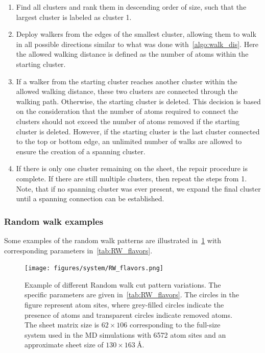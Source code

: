 \begin{enumerate}
  \item Find all clusters and rank them in descending order of size, such that the largest cluster is labeled as cluster 1.
  \item Deploy walkers from the edges of the smallest cluster, allowing them to walk in all possible directions similar to what was done with~\cref{algo:walk_dis}. Here the allowed walking distance is defined as the number of atoms within the starting cluster.
  \item If a walker from the starting cluster reaches another cluster within the allowed walking distance, these two clusters are connected through the walking path. Otherwise, the starting cluster is deleted. This decision is based on the consideration that the number of atoms required to connect the clusters should not exceed the number of atoms removed if the starting cluster is deleted. However, if the starting cluster is the last cluster connected to the top or bottom edge, an unlimited number of walks are allowed to ensure the creation of a spanning cluster.
  \item If there is only one cluster remaining on the sheet, the repair procedure is complete. If there are still multiple clusters, then repeat the steps from 1. Note, that if no spanning cluster was ever present, we expand the final cluster until a spanning connection can be established.
\end{enumerate}  
\subsubsection{Random walk examples}
Some examples of the random walk patterns are illustrated in~\cref{fig:RW_flavors} with corresponding parameters in~\cref{tab:RW_flavors}.

\begin{figure}[!htb]
  \centering
  \texttt{[image: figures/system/RW\_flavors.png]}
  \caption{Example of different Random walk cut pattern variations. The specific parameters are given in~\cref{tab:RW_flavors}. The circles in the figure represent atom sites, where grey-filled circles indicate the presence of atoms and transparent circles indicate removed atoms. The sheet matrix size is $62 \times 106$ corresponding to the full-size system used in the \acrshort{MD} simulations with 6572 atom sites and an approximate sheet size of $130 \times \SI{163}{\text{Å}}$.}
  \label{fig:RW_flavors}
\end{figure}

